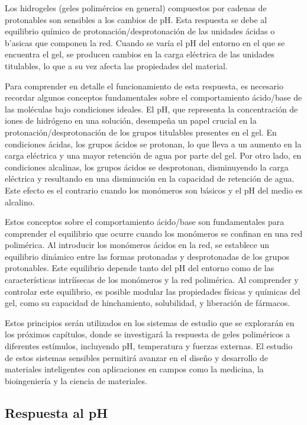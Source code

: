 Los hidrogeles (geles polim\'ercios en general) compuestos por cadenas de protonables son sensibles a los cambios de pH. Esta respuesta se debe al equilibrio qu\'imico de protonaci\'on/desprotonaci\'on de las unidades \'acidas o b'asicas que componen la red. Cuando se varía el pH del entorno en el que se encuentra el gel, se producen cambios en la carga el\'ectrica de las unidades titulables, lo que a su vez afecta las propiedades  del material.

Para comprender en detalle el funcionamiento de esta respuesta, es necesario recordar algunos conceptos fundamentales sobre el comportamiento \'acido/base de las mol\'eculas bajo condiciones ideales. El pH, que representa la concentraci\'on de iones de hidr\'ogeno en una soluci\'on, desempe\~na un papel crucial en la protonaci\'on/desprotonaci\'on de los grupos titulables presentes en el gel. En condiciones \'acidas, los grupos \'acidos se protonan, lo que lleva a un aumento en la carga el\'ectrica y una mayor retención de agua por parte del gel. Por otro lado, en condiciones alcalinas, los grupos \'acidos se desprotonan, disminuyendo la carga el\'ectrica y resultando en una disminuci\'on en la capacidad de retenci\'on de agua. Este efecto es el contrario cuando los mon\'omeros son b\'asicos y el pH del medio es alcalino.

Estos conceptos sobre el comportamiento \'acido/base son fundamentales para comprender el equilibrio que ocurre cuando los mon\'omeros se confinan en una red polim\'erica. Al introducir los mon\'omeros \'acidos en la red, se establece un equilibrio din\'amico entre las formas protonadas y desprotonadas de los grupos protonables. Este equilibrio depende tanto del pH del entorno como de las caracter\'isticas intrí\'isecas de los mon\'omeros y la red polim\'erica. Al comprender y controlar este equilibrio, es posible modular las propiedades f\'isicas y qu\'imicas del gel, como su capacidad de hinchamiento, solubilidad, y liberaci\'on de f\'armacos.

Estos principios ser\'an utilizados en los sistemas de estudio que se explorar\'an en los pr\'oximos cap\'itulos, donde se investigar\'a la respuesta de geles polim\'ericos a diferentes est\'imulos, incluyendo pH, temperatura y fuerzas externas. El estudio de estos sistemas sensibles permitir\'a avanzar en el dise\~no y desarrollo de materiales inteligentes con aplicaciones en campos como la medicina, la bioingenier\'ia y la ciencia de materiales.


\subsection{Respuesta al pH} \label{sec:film:respuesta-pH}

